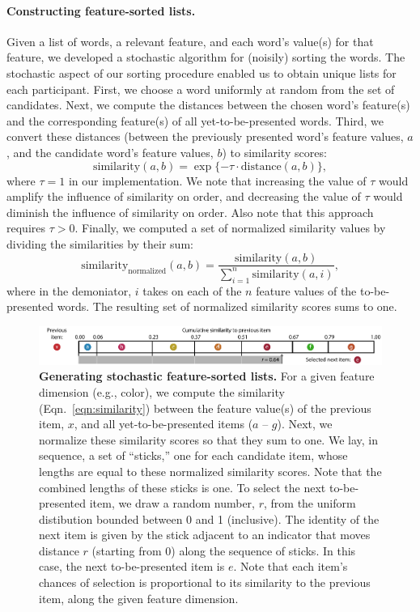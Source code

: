\documentclass[11pt]{article}
\begin{document}
\paragraph{Constructing feature-sorted lists.} Given a list of words, a
relevant feature, and each word's value(s) for that feature, we developed a
stochastic algorithm for (noisily) sorting the words. The stochastic aspect of
our sorting procedure enabled us to obtain unique lists for each participant.
First, we choose a word uniformly at random from the set of candidates. Next,
we compute the distances between the chosen word's feature(s) and the
corresponding feature(s) of all yet-to-be-presented words. Third, we convert
these distances (between the previously presented word's feature values, $a$,
and the candidate word's feature values, $b$) to similarity scores:
\begin{equation} \mathrm{similarity}(a, b) = \exp\{-\tau \cdot
\mathrm{distance}(a, b)\}, \label{eqn:similarity} \end{equation} where $\tau =
1$ in our implementation. We note that increasing the value of $\tau$ would
amplify the influence of similarity on order, and decreasing the value of
$\tau$ would diminish the influence of similarity on order. Also note that this
approach requires $\tau > 0$. Finally, we computed a set of normalized
similarity values by dividing the similarities by their sum: \begin{equation}
\mathrm{similarity}_{\mathrm{normalized}}(a, b) = \frac{\mathrm{similarity}(a,
b)}{\sum_{i=1}^n \mathrm{similarity}(a, i)}, \end{equation} where in the
demoniator, $i$ takes on each of the $n$ feature values of the to-be-presented
words. The resulting set of normalized similarity scores sums to one.

\begin{figure}[tp]
    \centering
        \includegraphics[width=\textwidth]{figures/stick}
        
\caption{\textbf{Generating stochastic feature-sorted lists.} For a given
feature dimension (e.g., color), we compute the similarity
(Eqn.~\ref{eqn:similarity}) between the feature value(s) of the previous item,
$x$, and all yet-to-be-presented items ($a$ -- $g$). Next, we normalize these
similarity scores so that they sum to one. We lay, in sequence, a set of
``sticks,'' one for each candidate item, whose lengths are equal to these
normalized similarity scores. Note that the combined lengths of these sticks is
one. To select the next to-be-presented item, we draw a random number, $r$,
from the uniform distibution bounded between 0 and 1 (inclusive). The identity
of the next item is given by the stick adjacent to an indicator that moves
distance $r$ (starting from 0) along the sequence of sticks. In this case, the
next to-be-presented item is $e$. Note that each item's chances of selection is
proportional to its similarity to the previous item, along the given feature
dimension.} \label{fig:stick} 

\end{figure}
\end{document}
